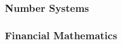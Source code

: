 \documentclass{beamer}
\begin{document}
\begin{frame}
\frametitle{Number Systems}

\end{frame}
\begin{frame}
\frametitle{Financial Mathematics}

\end{frame}
\end{document}
